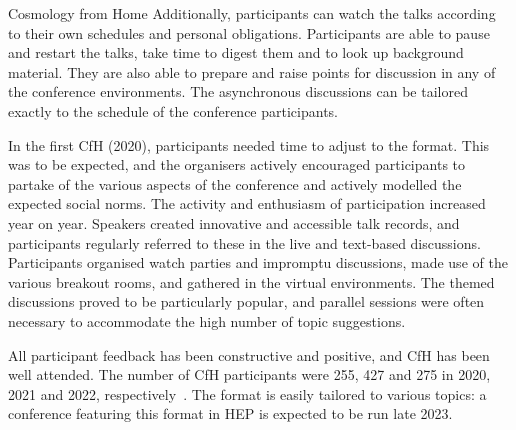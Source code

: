 \documentclass[../SustainableHEP.tex]{subfiles}
\begin{document}
\begin{casestudy}{Cosmology from Home}
Additionally, participants can watch the talks according to their own schedules and personal obligations. Participants are able to pause and restart the talks, take time to digest them and to look up background material. They are also able to prepare and raise points for discussion in any of the conference environments. The asynchronous discussions can be tailored exactly to the schedule of the conference participants.

In the first CfH (2020), participants needed time to adjust to the format. This was to be expected, and the organisers actively encouraged participants to partake of the various aspects of the conference and actively modelled the expected social norms. The activity and enthusiasm of participation increased year on year. Speakers created innovative and accessible talk records, and participants regularly referred to these in the live and text-based discussions. Participants organised watch parties and impromptu discussions, made use of the various breakout rooms, and gathered in the virtual environments. The themed discussions proved to be particularly popular, and parallel sessions were often necessary to accommodate the high number of topic suggestions.

All participant feedback has been constructive and positive, and CfH has been well attended. The number of CfH participants were 255, 427 and 275 in 2020, 2021 and 2022, respectively~\cite{CfHwebsite}.  The format is easily tailored to various topics: a conference featuring this format in HEP is expected to be run late 2023.

\end{casestudy}
\end{document}
